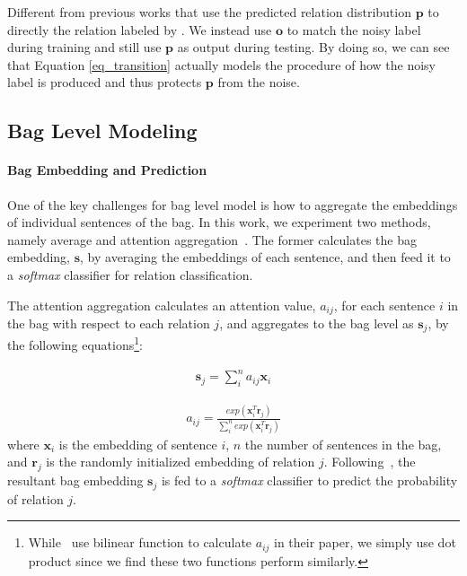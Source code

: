 Different from previous works that use the predicted relation distribution $\mathbf{p}$ to directly  the relation labeled by \DS{}. We instead use $\mathbf{o}$ to match the noisy label during training and still use $\mathbf{p}$ as output during testing. 
By doing so, we can see that Equation \ref{eq_transition} actually models the procedure of how the noisy label is produced and thus protects $\mathbf{p}$ from the noise.

\subsection{Bag Level Modeling}
\paragraph{Bag Embedding and Prediction}
One of the key challenges for bag level model is how to aggregate the embeddings of individual sentences of the bag.  
In this work, we experiment two methods, namely average and attention aggregation~\cite{lin2016neural}. 
The former calculates the bag embedding, $\mathbf{s}$, by averaging the embeddings of each sentence, and  then feed it to a \emph{softmax} classifier for relation classification.

The attention aggregation calculates an attention value, $a_{ij}$, for each sentence $i$ in the bag with respect to each relation $j$, and aggregates to  the bag level as  $\mathbf{s}_j$, by the following equations\footnote{While~\cite{lin2016neural} use bilinear function to calculate $a_{ij}$ in their paper, we simply use dot product since we find these two functions perform similarly.}:

\begin{equation}
\begin{aligned}
\mathbf{s}_j = \sum_i^{n}{a_{ij} \mathbf{x}_{i}}
\end{aligned}
\label{att_sum}
\end{equation}

\begin{equation}
\begin{aligned}
a_{ij} = \frac{exp(\mathbf{x}_i^T \mathbf{r}_j)}{\sum_i^n{exp(\mathbf{x}_i^T \mathbf{r}_j)}}
\end{aligned}
\label{cal_att}
\end{equation}
where $\mathbf{x}_{i}$ is the embedding of sentence $i$, $n$ the number of sentences in the bag, and $\mathbf{r}_j$ is the randomly initialized embedding of relation $j$.
Following~\cite{lin2016neural}, the resultant bag embedding $\mathbf{s}_j$ is fed to a \emph{softmax} classifier to predict the probability of relation $j$.  

